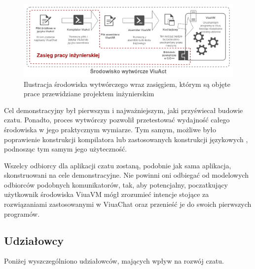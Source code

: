 \begin{figure}[h]
	\centering
	\includegraphics[width=\textwidth]{chat/fig/viuavm-env}
	\caption{Ilustracja środowiska wytwórczego wraz zasięgiem, którym są objęte prace przewidziane projektem inżynierskim}
\end{figure}

Cel demonstracyjny był pierwszym i najważniejszym, jaki przyświecał budowie
czatu. Ponadto, proces wytwórczy pozwolił przetestować wydajność całego
środowiska w jego praktycznym wymiarze. Tym samym, możliwe było poprawienie
konstrukcji kompilatora lub zastosowanych konstrukcji językowych \ViuAct,
podnosząc tym samym jego użyteczność.

Wszelcy odbiorcy dla aplikacji czatu zostaną, podobnie jak sama aplikacja,
skonstruowani na cele demonstracyjne. Nie powinni oni odbiegać od modelowych
odbiorców podobnych komunikatorów, tak, aby potencjalny, poczatkujący
użytkownik środowiska ViuaVM mógł zrozumieć intencje stojące za rozwiązaniami
zastosowanymi w ViuaChat oraz przenieść je do swoich pierwszych programów.

\subsection{Udziałowcy}

Poniżej wyszczególniono udziałowców, mających wpływ na rozwój czatu.

